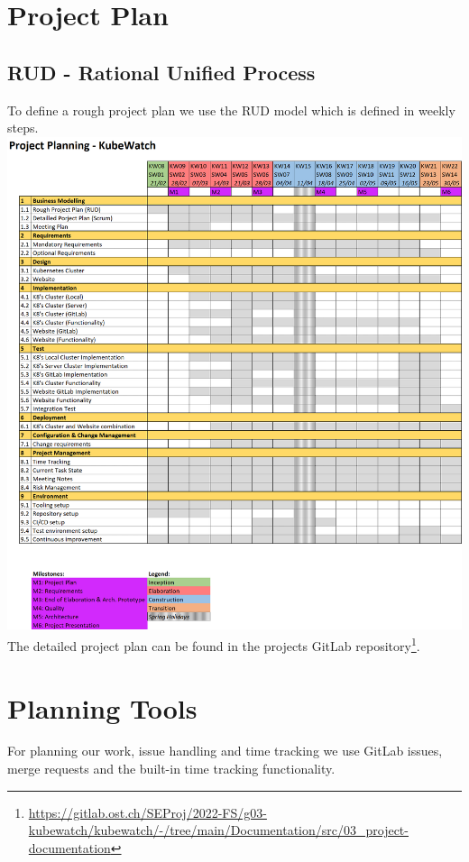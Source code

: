 \section{Project Plan}
\subsection{RUD - Rational Unified Process}
To define a rough project plan we use the RUD model which is defined in weekly steps. \newline
\includegraphics[width=\textwidth]{resources/project-plan-RUD.png}
\newline \newline
The detailed project plan can be found in the projects GitLab repository\footnote{\url{https://gitlab.ost.ch/SEProj/2022-FS/g03-kubewatch/kubewatch/-/tree/main/Documentation/src/03_project-documentation}}.

\section{Planning Tools}
For planning our work, issue handling and time tracking we use GitLab issues, merge requests and the built-in time tracking functionality.

